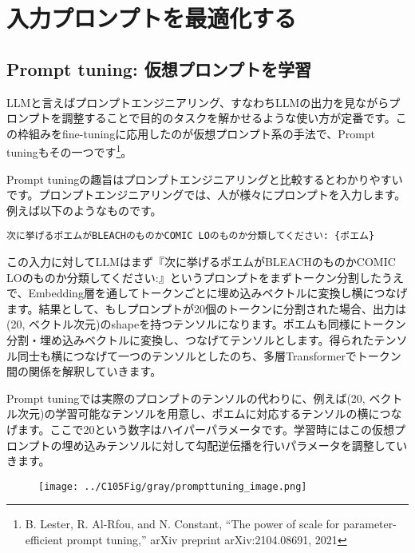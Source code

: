 \documentclass[a5paper,twoside,dvipdfmx]{jsarticle}
\begin{document}
\newpage

\section{入力プロンプトを最適化する}

\subsection{Prompt tuning: 仮想プロンプトを学習}

LLMと言えばプロンプトエンジニアリング、すなわちLLMの出力を見ながらプロンプトを調整することで目的のタスクを解かせるような使い方が定番です。この枠組みをfine-tuningに応用したのが仮想プロンプト系の手法で、\textsf{Prompt tuning}もその一つです\footnote{B. Lester, R. Al-Rfou, and N. Constant, “The power of scale for parameter-efficient prompt tuning,” arXiv preprint arXiv:2104.08691, 2021}。

Prompt tuningの趣旨はプロンプトエンジニアリングと比較するとわかりやすいです。プロンプトエンジニアリングでは、人が様々にプロンプトを入力します。例えば以下のようなものです。

\begin{lstlisting}
次に挙げるポエムがBLEACHのものかCOMIC LOのものか分類してください: {ポエム}
\end{lstlisting}

この入力に対してLLMはまず『次に挙げるポエムがBLEACHのものかCOMIC LOのものか分類してください:』というプロンプトをまずトークン分割したうえで、Embedding層を通してトークンごとに埋め込みベクトルに変換し横につなげます。結果として、もしプロンプトが20個のトークンに分割された場合、出力は(20, ベクトル次元)のshapeを持つテンソルになります。ポエムも同様にトークン分割・埋め込みベクトルに変換し、つなげてテンソルとします。得られたテンソル同士も横につなげて一つのテンソルとしたのち、多層Transformerでトークン間の関係を解釈していきます。

Prompt tuningでは実際のプロンプトのテンソルの代わりに、例えば(20, ベクトル次元)の学習可能なテンソルを用意し、ポエムに対応するテンソルの横につなげます。ここで20という数字はハイパーパラメータです。学習時にはこの仮想プロンプトの埋め込みテンソルに対して勾配逆伝播を行いパラメータを調整していきます。%


\begin{figure}[h]
  \centering
  \texttt{[image: ../C105Fig/gray/prompttuning\_image.png]}
 \end{figure} 
\end{document}
